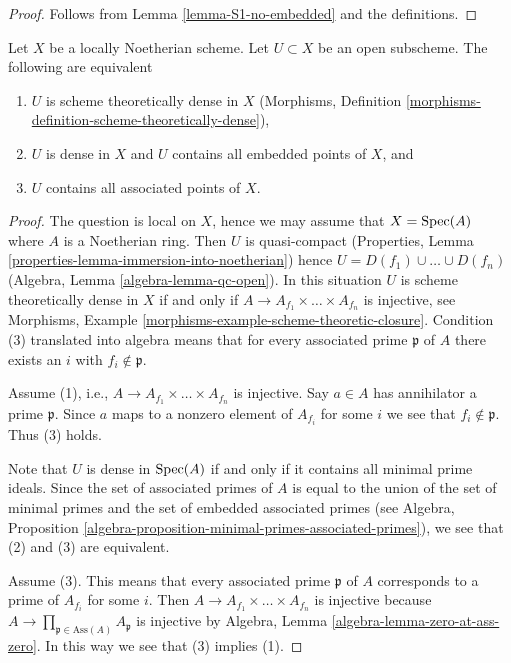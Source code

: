 \begin{proof}
Follows from Lemma \ref{lemma-S1-no-embedded} and the definitions.
\end{proof}

\begin{lemma}
\label{lemma-scheme-theoretically-dense-contain-embedded-points}
Let $X$ be a locally Noetherian scheme. Let $U \subset X$ be an
open subscheme. The following are equivalent
\begin{enumerate}
\item $U$ is scheme theoretically dense in $X$
(Morphisms, Definition \ref{morphisms-definition-scheme-theoretically-dense}),
\item $U$ is dense in $X$ and $U$ contains all embedded points of $X$, and
\item $U$ contains all associated points of $X$.
\end{enumerate}
\end{lemma}

\begin{proof}
The question is local on $X$, hence we may assume that $X = \mathop{\mathrm{Spec}}(A)$
where $A$ is a Noetherian ring. Then $U$ is quasi-compact
(Properties, Lemma \ref{properties-lemma-immersion-into-noetherian})
hence $U = D(f_1) \cup \ldots \cup D(f_n)$
(Algebra, Lemma \ref{algebra-lemma-qc-open}).
In this situation $U$ is scheme theoretically dense in $X$ if and only if
$A \to A_{f_1} \times \ldots \times A_{f_n}$ is injective, see
Morphisms, Example \ref{morphisms-example-scheme-theoretic-closure}.
Condition (3) translated into algebra means that for every associated
prime $\mathfrak p$ of $A$ there exists an $i$ with $f_i \not \in \mathfrak p$.

\medskip\noindent
Assume (1), i.e., $A \to A_{f_1} \times \ldots \times A_{f_n}$ is injective.
Say $a \in A$ has annihilator a prime $\mathfrak p$. Since $a$ maps
to a nonzero element of $A_{f_i}$ for some $i$ we see that
$f_i \not \in \mathfrak p$. Thus (3) holds.

\medskip\noindent
Note that $U$ is dense in $\mathop{\mathrm{Spec}}(A)$ if and only if it contains all
minimal prime ideals. Since the set of associated primes
of $A$ is equal to the union of the set of minimal primes and the
set of embedded associated primes (see Algebra, Proposition
\ref{algebra-proposition-minimal-primes-associated-primes}),
we see that (2) and (3) are equivalent.

\medskip\noindent
Assume (3). This means that every associated prime $\mathfrak p$ of $A$
corresponds to a prime of $A_{f_i}$ for some $i$. Then
$A \to A_{f_1} \times \ldots \times A_{f_n}$ is injective because
$A \to \prod_{\mathfrak p \in \text{Ass}(A)} A_\mathfrak p$ is injective
by Algebra, Lemma \ref{algebra-lemma-zero-at-ass-zero}. In this way
we see that (3) implies (1).
\end{proof}

